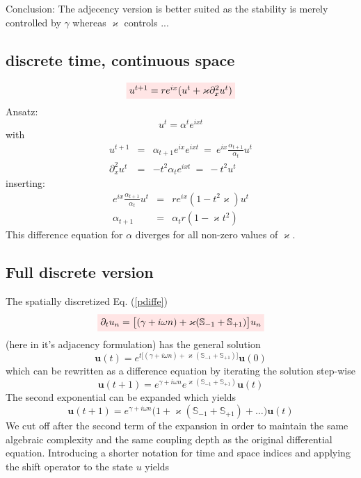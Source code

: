 \documentclass[11pt,twocolumn]{article}
\newcommand{\be}{\begin{equation}}
\newcommand{\ee}{\end{equation}}
\newcommand{\bea}{\begin{eqnarray*}}
\newcommand{\eea}{\end{eqnarray*}}
\newcommand{\w}{\omega}
\newcommand{\ka}{\varkappa}
\newcommand{\rbox}[1]{\colorbox{red!10}{$#1$}}
\begin{document}
Conclusion: The adjecency version is better suited as the stability is merely controlled by $\gamma$
whereas $\varkappa$ controls ...





  \subsection{discrete time, continuous space}

\be
    \rbox{u^{t+1} = re^{ix} ( u^t  +  \ka \partial_x^2 u^t )}
\ee
Ansatz:
\be
   u^t = \alpha^t e^{ixt}
\ee
with
\bea
    u^{t+1}           &=&  \alpha_{t+1} e^{ix} e^{ixt} \ = \ e^{ix} \frac{\alpha_{t+1}}{\alpha_t} u^t \\
    \partial_x^2 u^t  &=&  -t^2 \alpha_t e^{ixt} \ = \ -t^2 u^t
\eea
inserting:
\bea
     e^{ix} \frac{\alpha_{t+1}}{\alpha_t} u^t  &=&  re^{ix} ( 1 - t^2\ka ) u^t \\
     \alpha_{t+1}  &=&  \alpha_t r ( 1 - \ka t^2 )
\eea
This difference equation for $\alpha$ diverges for all non-zero values of $\ka$.





  \subsection{Full discrete version}

The spatially discretized Eq. (\ref{pdiffe})
$$
    \rbox{\partial_t u_n = \big[ (\gamma + i \w n) + \ka ( \mathbb{S}_{-1} + \mathbb{S}_{+1} )\big] u_n}
$$
(here in it's adjacency formulation) has the general solution
\be \label{discrete_projection}
    \mathbf{u}(t) = e^{t \big[ (\gamma + i \w n) + \ka ( \mathbb{S}_{-1} + \mathbb{S}_{+1} )\big]} \mathbf{u}(0)
\ee
which can be rewritten as a difference equation by iterating the solution step-wise
$$
    \mathbf{u}(t+1) = e^{\gamma + i \w n} e^{\ka ( \mathbb{S}_{-1} + \mathbb{S}_{+1} )} \mathbf{u}(t)
$$
The second exponential can be expanded which yields
$$
    \mathbf{u}(t+1) = e^{\gamma + i \w n} \big( 1 + \ka ( \mathbb{S}_{-1} + \mathbb{S}_{+1} ) + \dots \big) \mathbf{u}(t)
$$
We cut off after the second term of the expansion in order to maintain the same algebraic complexity and the same coupling depth as the original differential equation. Introducing a shorter notation for time and space indices and applying the shift operator to the state $u$ yields
\end{document}
